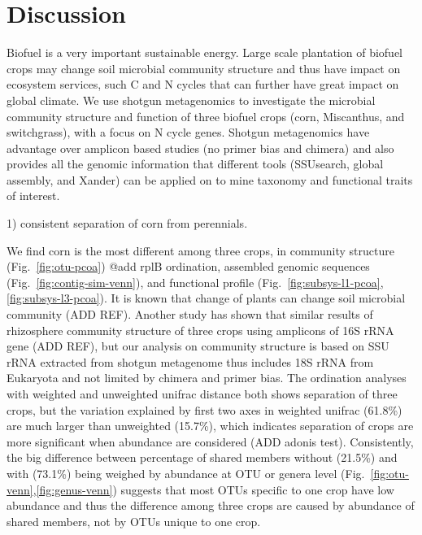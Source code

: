 \documentclass[12pt]{article}
\begin{document}


\section{Discussion}

Biofuel is a very important sustainable energy. Large scale plantation of biofuel crops may change soil microbial community structure and thus have impact on ecosystem services, such C and N cycles that can further have great impact on global climate. We use shotgun metagenomics to investigate the microbial community structure and function of three biofuel crops (corn, Miscanthus, and switchgrass), with a focus on N cycle genes. Shotgun metagenomics have advantage over amplicon based studies (no primer bias and chimera) and also provides all the genomic information that different tools (SSUsearch, global assembly, and Xander) can be applied on to mine taxonomy and functional traits of interest.

1) consistent separation of corn from perennials.

We find corn is the most different among three crops, in community structure (Fig.~\ref{fig:otu-pcoa}) @add rplB ordination, assembled genomic sequences (Fig.~\ref{fig:contig-sim-venn}), and functional profile (Fig.~\ref{fig:subsys-l1-pcoa},\ref{fig:subsys-l3-pcoa}). It is known that change of plants can change soil microbial community (ADD REF). Another study has shown that similar results of rhizosphere community structure of three crops using amplicons of 16S rRNA gene (ADD REF), but our analysis on community structure is based on SSU rRNA extracted from shotgun metagenome thus includes 18S rRNA from Eukaryota and not limited by chimera and primer bias. The ordination analyses with weighted and unweighted unifrac distance both shows separation of three crops, but the variation explained by first two axes in weighted unifrac (61.8\%) are much larger than unweighted (15.7\%), which indicates separation of crops are more significant when abundance are considered (ADD adonis test). Consistently, the big difference between percentage of shared members without (21.5\%) and with (73.1\%) being weighed by abundance at OTU or genera level (Fig.~\ref{fig:otu-venn},\ref{fig:genus-venn}) suggests that most OTUs specific to one crop have low abundance and thus the difference among three crops are caused by abundance of shared members, not by OTUs unique to one crop. 
\end{document}
